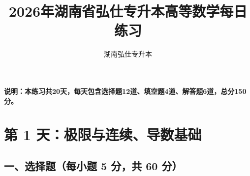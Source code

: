 \documentclass[11pt,a4paper]{article}
\title{2026年湖南省弘仕专升本高等数学每日练习}
\author{湖南弘仕专升本}
\date{}
\begin{document}
\maketitle

\begin{center}
    \textbf{说明：本练习共20天，每天包含选择题12道、填空题4道、解答题6道，总分150分。}
\end{center}

\newpage

\section*{第 1 天：极限与连续、导数基础}
\subsection*{一、选择题（每小题 5 分，共 60 分）}
\end{document}
